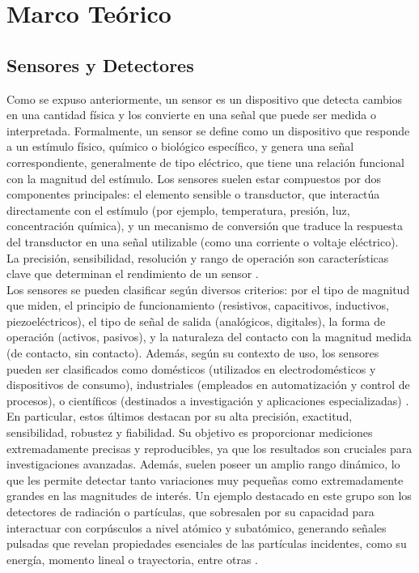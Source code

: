\documentclass[]{book}
\begin{document}
\section{Marco Teórico}
\subsection{Sensores y Detectores}

\noindent Como se expuso anteriormente, un sensor es un dispositivo que detecta cambios en una cantidad física y los convierte en una señal que puede ser medida o interpretada. Formalmente, un sensor se define como un dispositivo que responde a un estímulo físico, químico o biológico específico, y genera una señal correspondiente, generalmente de tipo eléctrico, que tiene una relación funcional con la magnitud del estímulo. Los sensores suelen estar compuestos por dos componentes principales: el elemento sensible o transductor, que interactúa directamente con el estímulo (por ejemplo, temperatura, presión, luz, concentración química), y un mecanismo de conversión que traduce la respuesta del transductor en una señal utilizable (como una corriente o voltaje eléctrico). La precisión, sensibilidad, resolución y rango de operación son características clave que determinan el rendimiento de un sensor \cite{webster2018measurement}.\\

\noindent Los sensores se pueden clasificar según diversos criterios: por el tipo de magnitud que miden, el principio de funcionamiento (resistivos, capacitivos, inductivos, piezoeléctricos), el tipo de señal de salida (analógicos, digitales), la forma de operación (activos, pasivos), y la naturaleza del contacto con la magnitud medida (de contacto, sin contacto). Además, según su contexto de uso, los sensores pueden ser clasificados como domésticos (utilizados en electrodomésticos y dispositivos de consumo), industriales (empleados en automatización y control de procesos), o científicos (destinados a investigación y aplicaciones especializadas) \cite{sinclair2000sensors}.\\

\noindent En particular, estos últimos destacan por su alta precisión, exactitud, sensibilidad, robustez y fiabilidad. Su objetivo es proporcionar mediciones extremadamente precisas y reproducibles, ya que los resultados son cruciales para investigaciones avanzadas. Además, suelen poseer un amplio rango dinámico, lo que les permite detectar tanto variaciones muy pequeñas como extremadamente grandes en las magnitudes de interés. Un ejemplo destacado en este grupo son los detectores de radiación o partículas, que sobresalen por su capacidad para interactuar con corpúsculos a nivel atómico y subatómico, generando señales pulsadas que revelan propiedades esenciales de las partículas incidentes, como su energía, momento lineal o trayectoria, entre otras \cite{kolanoski2020particle}.
\end{document}
